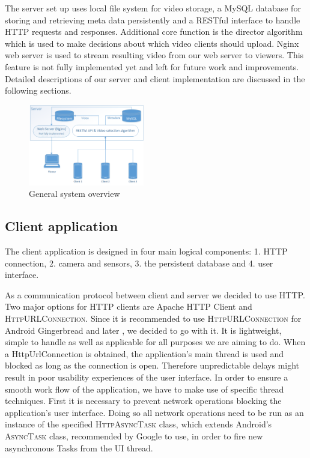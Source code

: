 \documentclass[conference]{IEEEtran}
\begin{document}
The server set up uses local file system for video storage, a MySQL database for storing and retrieving meta data persistently and a RESTful interface to handle HTTP requests and responses.
Additional core function is the director algorithm which is used to make decisions about which video clients should upload.
Nginx web server is used to stream resulting video from our web server to viewers.
This feature is not fully implemented yet and left for future work and improvements.
Detailed descriptions of our server and client implementation are discussed in the following sections.

\begin{figure}[!t]
	\centering
	\includegraphics[width=0.45\textwidth]{sys_arch.png}
	\caption{General system overview}
	\label{fig:gen_arch}
\end{figure}

\subsection{Client application}

The client application is designed in four main logical components: 1. HTTP connection, 2. camera and sensors, 3. the persistent database and 4. user interface.

As a communication protocol between client and server we decided to use HTTP.
Two major options for HTTP clients are Apache HTTP Client and \textsc{HttpURLConnection}.
Since it is recommended to use \textsc{HttpURLConnection} for Android Gingerbread and later \cite{jesse_wilson_androids},
we decided to go with it.
It is lightweight, simple to handle as well as applicable for all purposes we are aiming to do.
When a HttpUrlConnection is obtained, the application's main thread is used and blocked as long as the connection is open.
Therefore unpredictable delays might result in poor usability experiences of the user interface.
In order to ensure a smooth work flow of the application, we have to make use of specific thread techniques.
First it is necessary to prevent network operations blocking the application's user interface.
Doing so all network operations need to be run as an instance 
of the specified \textsc{HttpAsyncTask} class, which extends Android's \textsc{AsyncTask} class, recommended by Google to use, in order to fire new asynchronous Tasks from the UI thread.
\end{document}

